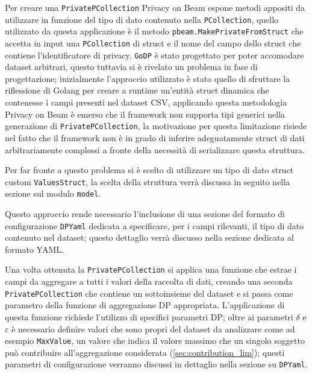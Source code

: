 Per creare una \texttt{PrivatePCollection} Privacy on Beam espone metodi appositi da utilizzare in funzione del tipo di dato contenuto nella \texttt{PCollection}, quello utilizzato da questa applicazione è il metodo \texttt{pbeam.MakePrivateFromStruct} che accetta in input una \texttt{PCollection} di struct e il nome del campo dello struct che contiene l'identificatore di privacy. \texttt{GoDP} è stato progettato per poter accomodare dataset arbitrari, questo tuttavia si è rivelato un problema in fase di progettazione; inizialmente l'approccio utilizzato è stato quello di sfruttare la riflessione di Golang per creare a runtime un'entità struct dinamica che contenesse i campi presenti nel dataset CSV, applicando questa metodologia Privacy on Beam è emerso che il framework non supporta tipi generici nella generazione di \texttt{PrivatePCollection}, la motivazione per questa limitazione risiede nel fatto che il framework non è in grado di inferire adeguatamente struct di dati arbitrariamente complessi a fronte della necessità di serializzare questa struttura.

Per far fronte a questo problema si è scelto di utilizzare un tipo di dato struct custom \texttt{ValuesStruct}, la scelta della struttura verrà discussa in seguito nella sezione sul modulo \texttt{model}.

Questo approccio rende necessario l'inclusione di una sezione del formato di configurazione \texttt{DPYaml} dedicata a specificare, per i campi rilevanti, il tipo di dato contenuto nel dataset; questo dettaglio verrà discusso nella sezione dedicata al formato YAML.

Una volta ottenuta la \texttt{PrivatePCollection} si applica una funzione che estrae i campi da aggregare a tutti i valori della raccolta di dati, creando una seconda \texttt{PrivatePCollection} che contiene un sottoinsieme del dataset e si passa come parametro della funzione di aggregazione DP appropriata. L'applicazione di questa funzione richiede l'utilizzo di specifici parametri DP; oltre ai parametri $\delta$ e $\varepsilon$ è necessario definire valori che sono propri del dataset da analizzare come ad esempio \texttt{MaxValue}, un valore che indica il valore massimo che un singolo soggetto può contribuire all'aggregazione considerata (\ref{sec:contribution_lim}); questi parametri di configurazione verranno discussi in dettaglio nella sezione su \texttt{DPYaml}.

